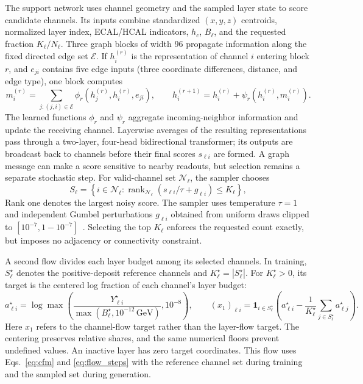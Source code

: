 \documentclass[11pt]{article}
\newcommand{\GeV}{\,\mathrm{GeV}}
\begin{document}
The support network uses channel geometry and the sampled layer state to score candidate channels. Its inputs combine standardized $(x,y,z)$ centroids, normalized layer index, ECAL/HCAL indicators, $h_c$, $B_\ell$, and the requested fraction $K_\ell/N_\ell$. Three graph blocks of width 96 propagate information along the fixed directed edge set $\mathcal E$. If $h_i^{(r)}$ is the representation of channel $i$ entering block $r$, and $e_{ji}$ contains five edge inputs (three coordinate differences, distance, and edge type), one block computes
\begin{equation}
 m_i^{(r)}=\sum_{j:(j,i)\in\mathcal E}
 \phi_r(h_j^{(r)},h_i^{(r)},e_{ji}),\qquad
 h_i^{(r+1)}=h_i^{(r)}+\psi_r(h_i^{(r)},m_i^{(r)}).
 \label{eq:message}
\end{equation}
The learned functions $\phi_r$ and $\psi_r$ aggregate incoming-neighbor information and update the receiving channel. Layerwise averages of the resulting representations pass through a two-layer, four-head bidirectional transformer; its outputs are broadcast back to channels before their final scores $s_{\ell i}$ are formed. A graph message can make a score sensitive to nearby readouts, but selection remains a separate stochastic step. For valid-channel set $\mathcal N_\ell$, the sampler chooses
\begin{equation}
 S_\ell=\left\{i\in\mathcal N_\ell:
 \operatorname{rank}_{\mathcal N_\ell}(s_{\ell i}/\tau+g_{\ell i})\leq K_\ell\right\},
 \label{eq:topk}
\end{equation}
Rank one denotes the largest noisy score. The sampler uses temperature $\tau=1$ and independent Gumbel perturbations $g_{\ell i}$ obtained from uniform draws clipped to $[10^{-7},1-10^{-7}]$~\cite{gumbeltopk}. Selecting the top $K_\ell$ enforces the requested count exactly, but imposes no adjacency or connectivity constraint.

A second flow divides each layer budget among its selected channels. In training, $S_\ell^\star$ denotes the positive-deposit reference channels and $K_\ell^\star=|S_\ell^\star|$. For $K_\ell^\star>0$, its target is the centered log fraction of each channel's layer budget:
\begin{equation}
 a_{\ell i}^\star=\log\max\!\left(
 \frac{Y_{\ell i}^\star}{\max(B_\ell^\star,10^{-12}\GeV)},10^{-8}\right),\qquad
 (x_1)_{\ell i}=\mathbf 1_{i\in S_\ell^\star}
 \left(a_{\ell i}^\star-\frac{1}{K_\ell^\star}
 \sum_{j\in S_\ell^\star}a_{\ell j}^\star\right).
 \label{eq:share_target}
\end{equation}
Here $x_1$ refers to the channel-flow target rather than the layer-flow target. The centering preserves relative shares, and the same numerical floors prevent undefined values. An inactive layer has zero target coordinates. This flow uses Eqs.~\eqref{eq:cfm} and \eqref{eq:flow_steps} with the reference channel set during training and the sampled set during generation.
\end{document}
